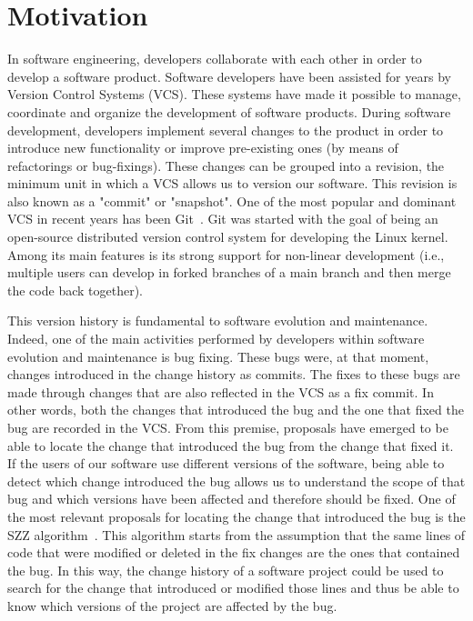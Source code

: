 \section{Motivation}

In software engineering, developers collaborate with each other in order to develop a software product. 
Software developers have been assisted for years by Version Control Systems (VCS). 
These systems have made it possible to manage, coordinate and organize the development of software products. 
During software development, developers implement several changes to the product in order to introduce new functionality or improve pre-existing ones (by means of refactorings or bug-fixings).
These changes can be grouped into a revision, the minimum unit in which a VCS allows us to version our software. 
This revision is also known as a "commit" or "snapshot".
One of the most popular and dominant VCS in recent years has been Git~\cite{VersionControlSystemSurvey:2022:Online}. 
Git was started with the goal of being an open-source distributed version control system for developing the Linux kernel.
Among its main features is its strong support for non-linear development (i.e., multiple users can develop in forked branches of a main branch and then merge the code back together).

This version history is fundamental to software evolution and maintenance. 
Indeed, one of the main activities performed by developers within software evolution and maintenance is bug fixing.
These bugs were, at that moment, changes introduced in the change history as commits.
The fixes to these bugs are made through changes that are also reflected in the VCS as a fix commit. 
In other words, both the changes that introduced the bug and the one that fixed the bug are recorded in the VCS. 
From this premise, proposals have emerged to be able to locate the change that introduced the bug from the change that fixed it. 
If the users of our software use different versions of the software, being able to detect which change introduced the bug allows us to understand the scope of that bug and which versions have been affected and therefore should be fixed.
One of the most relevant proposals for locating the change that introduced the bug is the SZZ algorithm~\cite{Sliwerski:2005:CIF:1083142.1083147}. 
This algorithm starts from the assumption that the same lines of code that were modified or deleted in the fix changes are the ones that contained the bug. 
In this way, the change history of a software project could be used to search for the change that introduced or modified those lines and thus be able to know which versions of the project are affected by the bug.

